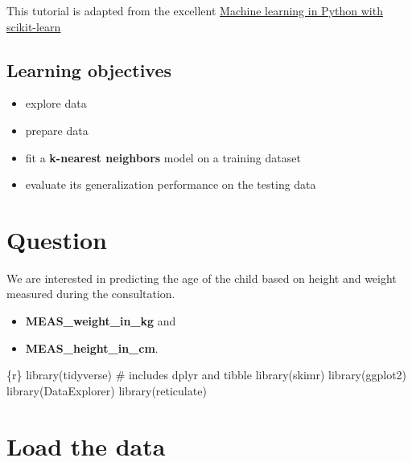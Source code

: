\documentclass[
  letterpaper,
  DIV=11,
  numbers=noendperiod,
  oneside]{scrreprt}
\newenvironment{Shaded}{\begin{snugshade}}{\end{snugshade}}
\newcommand{\CommentTok}[1]{\textcolor[rgb]{0.37,0.37,0.37}{#1}}
\newcommand{\FunctionTok}[1]{\textcolor[rgb]{0.28,0.35,0.67}{#1}}
\newcommand{\InformationTok}[1]{\textcolor[rgb]{0.37,0.37,0.37}{#1}}
\newcommand{\NormalTok}[1]{\textcolor[rgb]{0.00,0.23,0.31}{#1}}
\providecommand{\tightlist}{%
  \setlength{\itemsep}{0pt}\setlength{\parskip}{0pt}}\usepackage{longtable,booktabs,array}
\begin{document}
This tutorial is adapted from the excellent
\href{https://www.fun-mooc.fr/en/courses/machine-learning-python-scikit-learn/}{Machine
learning in Python with scikit-learn}

\hypertarget{learning-objectives-9}{%
\subsection{Learning objectives}\label{learning-objectives-9}}

\begin{itemize}
\tightlist
\item
  explore data
\item
  prepare data
\item
  fit a \textbf{k-nearest neighbors} model on a training dataset
\item
  evaluate its generalization performance on the testing data
\end{itemize}

\hypertarget{question}{%
\section{Question}\label{question}}

We are interested in predicting the age of the child based on height and
weight measured during the consultation.

\begin{itemize}
\tightlist
\item
  \textbf{MEAS\_weight\_in\_kg} and
\item
  \textbf{MEAS\_height\_in\_cm}.
\end{itemize}

\begin{Shaded}
\begin{Highlighting}[]
\InformationTok{\textasciigrave{}\textasciigrave{}\textasciigrave{}\{r\}}
\FunctionTok{library}\NormalTok{(tidyverse) }\CommentTok{\# includes dplyr and tibble}
\FunctionTok{library}\NormalTok{(skimr)}
\FunctionTok{library}\NormalTok{(ggplot2)}
\FunctionTok{library}\NormalTok{(DataExplorer)}
\FunctionTok{library}\NormalTok{(reticulate)}
\InformationTok{\textasciigrave{}\textasciigrave{}\textasciigrave{}}
\end{Highlighting}
\end{Shaded}

\hypertarget{load-the-data}{%
\section{Load the data}\label{load-the-data}}
\end{document}
